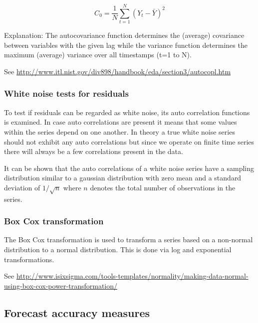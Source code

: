 \begin{equation}
C_0 = \frac{1}{N} \sum\limits_{t=1}^{N} (Y_t - \bar{Y})^2
\label{eq:variance_func}
\end{equation}


Explanation: The autocovariance function determines the (average) covariance between variables with the given lag while the variance function determines the maximum (average) variance over all timestamps (t=1 to N). 


See \url{http://www.itl.nist.gov/div898/handbook/eda/section3/autocopl.htm}


\subsubsection{White noise tests for residuals}

To test if residuals can be regarded as white noise, its auto correlation functions is examined. In case auto correlations are present it means that some values within the series depend on one another. In theory a true white noise series should not exhibit any auto correlations but since we operate on finite time series there will always be a few correlations present in the data\cite{makridakisforecasting}. 

It can be shown that the auto correlations of a white noise series have a sampling distribution similar to a gaussian distribution with zero mean and a standard deviation of $1/\sqrt{n}$ where $n$ denotes the total number of observations in the series\cite{makridakisforecasting}. 



\subsubsection{Box Cox transformation}

The Box Cox transformation is used to transform a series based on a non-normal distribution to a normal distribution. This is done via log and exponential transformations. 

See \url{http://www.isixsigma.com/tools-templates/normality/making-data-normal-using-box-cox-power-transformation/}





\subsection{Forecast accuracy measures}

